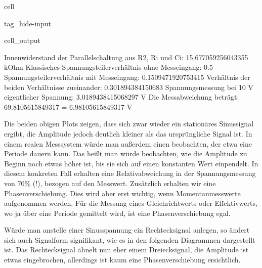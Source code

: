 \documentclass[letterpaper,10pt,english]{jupyterBook}
\begin{document}
\begin{sphinxuseclass}{cell}
\begin{sphinxuseclass}{tag_hide-input}\begin{sphinxVerbatimOutput}

\begin{sphinxuseclass}{cell_output}
\begin{sphinxVerbatim}[commandchars=\\\{\}]
Innenwiderstand der Parallelschaltung aus R\PYGZus{}2, R\PYGZus{}i und C\PYGZus{}i:  15.677059256043355 kOhm
Klassisches Spannungsteilerverhältnis ohne Messeingang:  0.5
Spannungsteilerverhältnis mit Messeingang:  0.1509471920753415
Verhältnis der beiden Verhältnisse zueinander:  0.301894384150683
Spannungsmessung bei  10 V eigentlicher Spannung:  3.0189438415068297 V
Die Messabweichung beträgt:  69.8105615849317 \PYGZpc{} =  \PYGZhy{}6.98105615849317 V
\end{sphinxVerbatim}

\noindent{}

\end{sphinxuseclass}\end{sphinxVerbatimOutput}

\end{sphinxuseclass}
\end{sphinxuseclass}
\sphinxAtStartPar
Die beiden obigen Plots zeigen, dass sich zwar wieder ein stationäres Sinussignal ergibt, die Amplitude jedoch deutlich kleiner als das ursprüngliche Signal ist. In einem realen Messsystem würde man außerdem einen  beobachten, der etwa eine Periode dauern kann. Das heißt man würde beobachten, wie die Amplitude zu Beginn noch etwas höher ist, bis sie sich auf einen konstanten Wert einpendelt. In diesem konkreten Fall erhalten eine Relativabweichung in der Spannungsmessung von 70\% (!), bezogen auf den Messwert. Zusätzlich erhalten wir eine Phasenverschiebung. Dies wird aber erst wichtig, wenn Momentanmesswerte aufgenommen werden. Für die Messung eines Gleichrichtwerts oder Effektivwerts, wo ja über eine Periode gemittelt wird, ist eine Phasenverschiebung egal.

\sphinxAtStartPar
Würde man anstelle einer Sinusspannung ein Rechtecksignal anlegen, so ändert sich auch Signalform signifikant, wie es in den folgenden Diagrammen dargestellt ist. Das Rechtecksignal ähnelt nun eher einem Dreiecksignal, die Amplitude ist etwas eingebrochen, allerdings ist kaum eine Phasenverschiebung ersichtlich.
\end{document}
